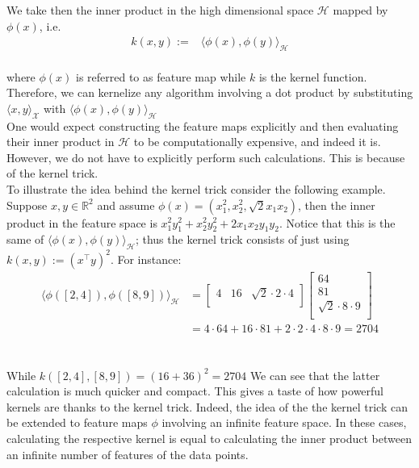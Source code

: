 We take then the inner product in the high dimensional space $\mathcal{H}$ mapped by $\phi(x)$, i.e.\
\\
\begin{align*}
k(x,y):=&\langle \phi(x), \phi(y) \rangle_{\mathcal{H}}
\end{align*}
\\
where $\phi(x)$ is referred to as feature map while $k$ is the kernel function.
\\
Therefore, we can kernelize any algorithm involving a dot product by substituting $\langle x, y \rangle_{\mathcal{X}}$ with $\langle \phi(x), \phi(y) \rangle_{\mathcal{H}}$
\\
One would expect constructing the feature maps explicitly and then evaluating their inner product in $\mathcal{H}$ to be computationally expensive, and indeed it is. However, we do not have to explicitly perform such calculations. This is because of the kernel trick.
\\
To illustrate the idea behind the kernel trick consider the following example.
Suppose $x, y \in \mathbb{R}^2$ and assume $\phi(x)=(x_{1}^{2},x_{2}^{2},\sqrt{2}x_{1}x_{2})$, then the inner product in the feature space is $x_{1}^{2}y_{1}^{2}+x_{2}^{2}y_{2}^{2}+2x_{1}x_{2}y_{1}y_{2}$.
Notice that this is the same of $\langle \phi(x), \phi(y) \rangle_{\mathcal{H}}$; thus the kernel trick consists of just using $k(x,y):=(x^\intercal y)^2$.
For instance:
\\
$$
\begin{aligned}
\langle \phi([2,4]),\phi([8,9]) \rangle_{\mathcal{H}}&=  \left[ {\begin{array}{cccc}
    4 & 16 &     \sqrt{2}\cdot 2 \cdot 4\\
  \end{array} } \right]
  \left[ {\begin{array}{cccc}
    64\\
    81\\
    \sqrt{2}\cdot8 \cdot 9
    \\
  \end{array} } \right]\\ &=4\cdot 64 +16\cdot 81 +2 \cdot 2 \cdot 4 \cdot 8 \cdot 9=2704
\end{aligned}
$$
\\
\\
While $k([2,4], [8,9])=(16+36)^2=2704$
We can see that the latter calculation is much quicker and compact.
This gives a taste of how powerful kernels are thanks to the kernel trick.
Indeed, the idea of the the kernel trick can be extended to feature maps
$\phi$ involving an infinite feature space. In these cases, calculating the
respective kernel is equal to calculating the inner product between an infinite
number of features of the data points.



